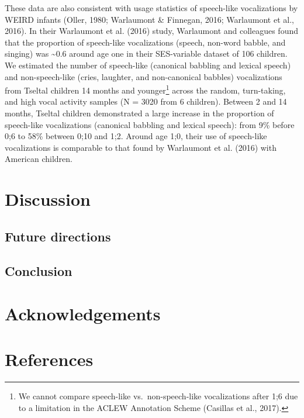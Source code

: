 \documentclass[floatsintext,man]{apa6}
\theoremstyle{definition}
\theoremstyle{definition}
\theoremstyle{definition}
\theoremstyle{remark}
\begin{document}
These data are also consistent with usage statistics of speech-like
vocalizations by WEIRD infants (Oller, 1980; Warlaumont \& Finnegan,
2016; Warlaumont et al., 2016). In their Warlaumont et al. (2016) study,
Warlaumont and colleagues found that the proportion of speech-like
vocalizations (speech, non-word babble, and singing) was
\textasciitilde{}0.6 around age one in their SES-variable dataset of 106
children. We estimated the number of speech-like (canonical babbling and
lexical speech) and non-speech-like (cries, laughter, and non-canonical
babbles) vocalizations from Tseltal children 14 months and
younger\footnote{We cannot compare speech-like vs.~non-speech-like
  vocalizations after 1;6 due to a limitation in the ACLEW Annotation
  Scheme (Casillas et al., 2017).} across the random, turn-taking, and
high vocal activity samples (N = 3020 from 6 children). Between 2 and 14
months, Tseltal children demonstrated a large increase in the proportion
of speech-like vocalizations (canonical babbling and lexical speech):
from 9\% before 0;6 to 58\% between 0;10 and 1;2. Around age 1;0, their
use of speech-like vocalizations is comparable to that found by
Warlaumont et al. (2016) with American children.

\section{Discussion}\label{disc}

\subsection{Future directions}\label{disc-future}

\subsection{Conclusion}\label{disc-conclusion}

\section{Acknowledgements}\label{acknowledgements}

\newpage

\section{References}\label{refs}

\begingroup
\setlength{\parindent}{-0.5in} \setlength{\leftskip}{0.5in}
\end{document}
